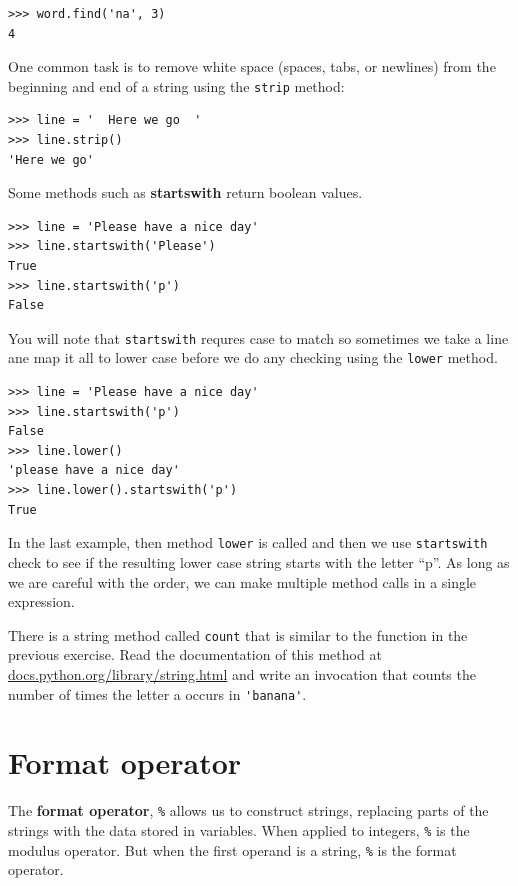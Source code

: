 \documentclass[10pt]{book}
\begin{document}

\beforeverb
\begin{verbatim}
>>> word.find('na', 3)
4
\end{verbatim}
\afterverb
%
One common task is to remove white space (spaces, tabs, or newlines) from
the beginning and end of a string using the {\tt strip} method:

\beforeverb
\begin{verbatim}
>>> line = '  Here we go  '
>>> line.strip()
'Here we go'
\end{verbatim}
\afterverb
%
Some methods such as {\bf startswith} return boolean values.

\beforeverb
\begin{verbatim}
>>> line = 'Please have a nice day'
>>> line.startswith('Please')
True
>>> line.startswith('p')
False
\end{verbatim}
\afterverb
%
You will note that {\tt startswith} requres case to match so sometimes
we take a line ane map it all to lower case before we do any checking
using the {\tt lower} method.

\beforeverb
\begin{verbatim}
>>> line = 'Please have a nice day'
>>> line.startswith('p')
False
>>> line.lower()
'please have a nice day'
>>> line.lower().startswith('p')
True
\end{verbatim}
\afterverb
%
In the last example, then method {\tt lower} is called
and then we use {\tt startswith}
check to see if the resulting lower case string
starts with the letter ``p''.  As long as we are careful
with the order, we can make multiple method calls in a
single expression.

\begin{ex}

There is a string method called {\tt count} that is similar
to the function in the previous exercise.  Read the documentation
of this method at
\url{docs.python.org/library/string.html}
and write an invocation that counts the number of times the 
letter a  occurs
in \verb"'banana'".
\end{ex}


\section{Format operator}


The {\bf format operator}, {\tt \%}
allows us to construct strings, replacing parts of the strings
with the data stored in variables.
When applied to integers, {\tt \%} is the modulus operator.  But
when the first operand is a string, {\tt \%} is the format operator.
\end{document}
